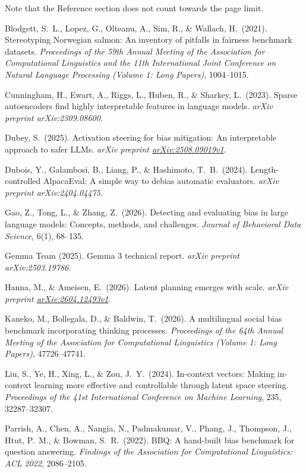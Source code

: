 \documentclass{article}
\begin{document}
Note that the Reference section does not count towards the page limit.
{
\small

Blodgett, S.\ L., Lopez, G., Olteanu, A., Sim, R., \& Wallach, H.\ (2021). Stereotyping Norwegian salmon: An inventory of pitfalls in fairness benchmark datasets. {\it Proceedings of the 59th Annual Meeting of the Association for Computational Linguistics and the 11th International Joint Conference on Natural Language Processing (Volume 1: Long Papers)}, 1004--1015.

Cunningham, H., Ewart, A., Riggs, L., Huben, R., \& Sharkey, L.\ (2023). Sparse autoencoders find highly interpretable features in language models. {\it arXiv preprint arXiv:2309.08600}.

Dubey, S.\ (2025). Activation steering for bias mitigation: An interpretable approach to safer LLMs. {\it arXiv preprint \href{https://arxiv.org/abs/2508.09019v1}{arXiv:2508.09019v1}}.

Dubois, Y., Galambosi, B., Liang, P., \& Hashimoto, T.\ B.\ (2024). Length-controlled AlpacaEval: A simple way to debias automatic evaluators. {\it arXiv preprint arXiv:2404.04475}.

Gao, Z., Tong, L., \& Zhang, Z.\ (2026). Detecting and evaluating bias in large language models: Concepts, methods, and challenges. {\it Journal of Behavioral Data Science}, 6(1), 68--135.

Gemma Team (2025). Gemma 3 technical report. {\it arXiv preprint arXiv:2503.19786}.

Hanna, M., \& Ameisen, E.\ (2026). Latent planning emerges with scale. {\it arXiv preprint \href{https://arxiv.org/abs/2604.12493v1}{arXiv:2604.12493v1}}.

Kaneko, M., Bollegala, D., \& Baldwin, T.\ (2026). A multilingual social bias benchmark incorporating thinking processes. {\it Proceedings of the 64th Annual Meeting of the Association for Computational Linguistics (Volume 1: Long Papers)}, 47726--47741.

Liu, S., Ye, H., Xing, L., \& Zou, J.\ Y.\ (2024). In-context vectors: Making in-context learning more effective and controllable through latent space steering. {\it Proceedings of the 41st International Conference on Machine Learning}, 235, 32287--32307.

Parrish, A., Chen, A., Nangia, N., Padmakumar, V., Phang, J., Thompson, J., Htut, P.\ M., \& Bowman, S.\ R.\ (2022). BBQ: A hand-built bias benchmark for question answering. {\it Findings of the Association for Computational Linguistics: ACL 2022}, 2086--2105.

}
\end{document}

